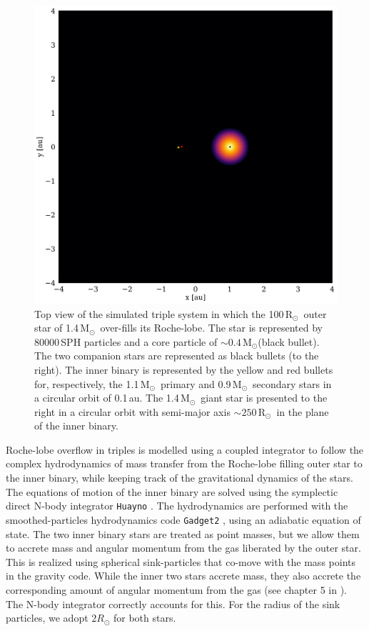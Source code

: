 \documentclass[twocolumn]{aastex62}
\newcommand{\MSun}{\mbox{M$_\odot$}}
\newcommand{\RSun}{\mbox{R$_\odot$}}
\begin{document}
\begin{figure}[ht!]
  \includegraphics[width=\columnwidth]{fig_BBSS_gas_M14Msun_A010au_t0002.png}
\caption{Top view of the simulated triple system in which the
  100\,\RSun\, outer star of 1.4\,\MSun\, over-fills its
  Roche-lobe.  The star is represented by 80000\,SPH particles and a
  core particle of $\sim 0.4$\,\MSun (black bullet). The two companion
  stars are represented as black bullets (to the right).  The inner
  binary is represented by the yellow and red bullets for, respectively, the
  1.1\,\MSun\, primary and 0.9\,\MSun\, secondary stars in a circular
  orbit of 0.1\,au. The 1.4\,\MSun\, giant star is presented to the
  right in a circular orbit with semi-major axis $\sim 250$\,\RSun\, in the plane of the
  inner binary.
\label{fig:topview_at_t0}}
\end{figure}

Roche-lobe overflow in triples is modelled using a coupled integrator
to follow the complex hydrodynamics of mass transfer from the
Roche-lobe filling outer star to the inner binary, while keeping track
of the gravitational dynamics of the stars.  The equations of motion
of the inner binary are solved using the symplectic direct N-body
integrator \texttt{Huayno} \citep{2012NewA...17..711P}. The
hydrodynamics are performed with the smoothed-particles hydrodynamics
code \texttt{Gadget2} \citep{2000ascl.soft03001S}, using an adiabatic
equation of state.  The two inner binary stars are treated as point
masses, but we allow them to accrete mass and angular momentum from
the gas liberated by the outer star.  This is realized using spherical
sink-particles that co-move with the mass points in the gravity
code. While the inner two stars accrete mass, they also accrete the
corresponding amount of angular momentum from the gas (see chapter 5
in \cite{AMUSE}).  The N-body integrator correctly accounts for this.
For the radius of the sink particles, we adopt $2 R_\odot$ for both
stars.
\end{document}
